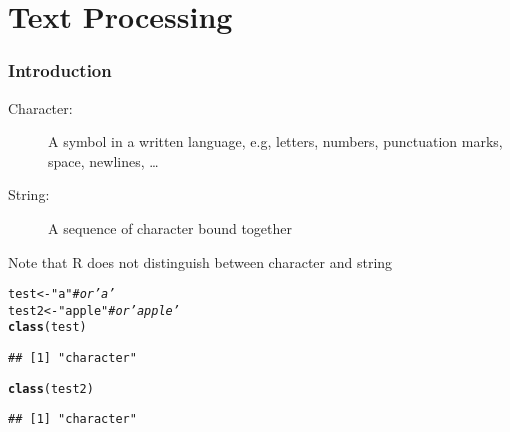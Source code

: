 \documentclass[paper=screen,mathserif]{beamer}\usepackage[]{graphicx}\usepackage[]{color}
\makeatletter
\newcommand{\hlstr}[1]{\textcolor[rgb]{0.192,0.494,0.8}{#1}}%
\newcommand{\hlcom}[1]{\textcolor[rgb]{0.678,0.584,0.686}{\textit{#1}}}%
\newcommand{\hlstd}[1]{\textcolor[rgb]{0.345,0.345,0.345}{#1}}%
\newcommand{\hlkwb}[1]{\textcolor[rgb]{0.69,0.353,0.396}{#1}}%
\newcommand{\hlkwd}[1]{\textcolor[rgb]{0.737,0.353,0.396}{\textbf{#1}}}%
\newenvironment{kframe}{%
 \def\at@end@of@kframe{}%
 \ifinner\ifhmode%
  \def\at@end@of@kframe{\end{minipage}}%
  \begin{minipage}{\columnwidth}%
 \fi\fi%
 \def\FrameCommand##1{\hskip\@totalleftmargin \hskip-\fboxsep
 \colorbox{shadecolor}{##1}\hskip-\fboxsep
     \hskip-\linewidth \hskip-\@totalleftmargin \hskip\columnwidth}%
 \MakeFramed {\advance\hsize-\width
   \@totalleftmargin\z@ \linewidth\hsize
   \@setminipage}}%
 {\par\unskip\endMakeFramed%
 \at@end@of@kframe}
\newenvironment{knitrout}{}{} %
\newcommand{\ft}[1]{\frametitle{#1}}
\newenvironment{xframe}[1][]
{\begin{frame}[fragile,environment=xframe]
    \frametitle{#1}}
  {\end{frame}}
\makeatother
\begin{document}
\section{Text Processing}

\begin{xframe}
  \ft{Introduction}
  
  \begin{description}
  \item[Character:] A symbol in a written language, e.g, letters,
    numbers, punctuation marks, space, newlines, \dots
  \item[String:] A sequence of character bound together
  \end{description}
  Note that R does not distinguish between character and string
\begin{knitrout}\scriptsize
{}\color{fgcolor}\begin{kframe}
\begin{alltt}
\hlstd{test} \hlkwb{<-} \hlstr{"a"} \hlcom{# or 'a'}
\hlstd{test2} \hlkwb{<-} \hlstr{"apple"} \hlcom{# or 'apple'}
\hlkwd{class}\hlstd{(test)}
\end{alltt}
\begin{verbatim}
## [1] "character"
\end{verbatim}
\begin{alltt}
\hlkwd{class}\hlstd{(test2)}
\end{alltt}
\begin{verbatim}
## [1] "character"
\end{verbatim}
\end{kframe}
\end{knitrout}

\end{xframe}
\end{document}
